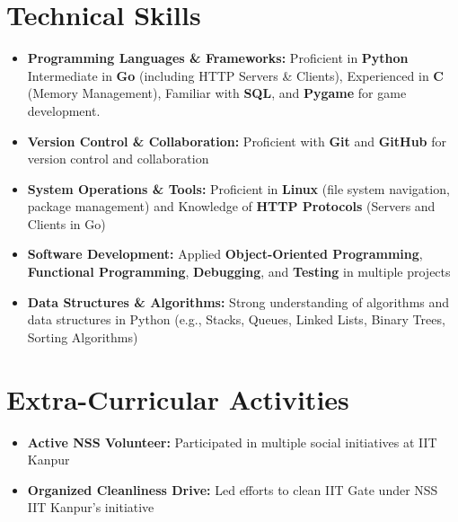 \documentclass[9pt]{article}
\begin{document}
\section{Technical Skills}
\begin{itemize}
    \item \textbf{Programming Languages \& Frameworks:} Proficient in \textbf{Python}  Intermediate in \textbf{Go} (including HTTP Servers \& Clients), Experienced in \textbf{C} (Memory Management), Familiar with \textbf{SQL}, and \textbf{Pygame} for game development.
    \item \textbf{Version Control \& Collaboration:} Proficient with \textbf{Git} and \textbf{GitHub} for version control and collaboration
    \item \textbf{System Operations \& Tools:} Proficient in \textbf{Linux} (file system navigation, package management) and Knowledge of \textbf{HTTP Protocols} (Servers and Clients in Go)
    \item \textbf{Software Development:} Applied \textbf{Object-Oriented Programming}, \textbf{Functional Programming}, \textbf{Debugging}, and \textbf{Testing} in multiple projects
    \item \textbf{Data Structures \& Algorithms:} Strong understanding of algorithms and data structures in Python (e.g., Stacks, Queues, Linked Lists, Binary Trees, Sorting Algorithms)
\end{itemize}

\section{Extra-Curricular Activities}
\begin{itemize}
    \item \textbf{Active NSS Volunteer:} Participated in multiple social initiatives at IIT Kanpur
    \item \textbf{Organized Cleanliness Drive:} Led efforts to clean IIT Gate under NSS IIT Kanpur’s initiative
\end{itemize}
\end{document}
